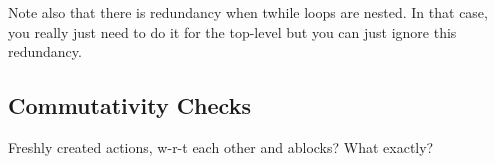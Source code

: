 Note also that there is redundancy when twhile loops are nested.  In that case, you really just need to do it for the top-level but you can just ignore this redundancy.

\subsection{Commutativity Checks}
Freshly created actions, w-r-t each other and ablocks? What exactly?






